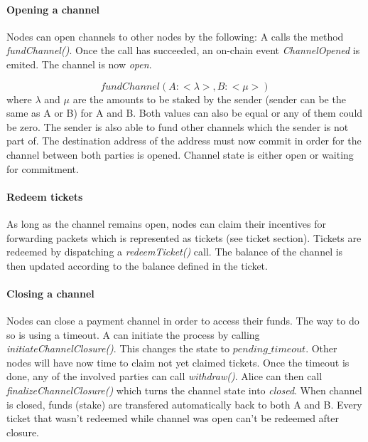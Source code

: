 \paragraph{Opening a channel} Nodes can open channels to other nodes by the following:
A calls the method \textit{fundChannel()}. Once the call has succeeded, an on-chain event \textit{ChannelOpened} is emited. The channel is now \textit{open}.


$$fundChannel(A: <\lambda>, B: <\mu>)$$ where $\lambda$ and $\mu$ are the amounts to be staked by the sender (sender can be the same as A or B) for A and B. Both values can also be equal or any of them could be zero. The sender is also able to fund other channels which the sender is not part of.
The destination address of the address must now commit in order for the channel between both parties is opened. Channel state is either open or waiting for commitment.

\paragraph{Redeem tickets}
As long as the channel remains open, nodes can claim their incentives for forwarding packets which is represented as tickets (see ticket section). Tickets are redeemed by dispatching a \textit{redeemTicket()} call. The balance of the channel is then updated according to the balance defined in the ticket.
\paragraph{Closing a channel}
Nodes can close a payment channel in order to access their funds. The way to do so is using a timeout.
A can initiate the process by calling \textit{initiateChannelClosure()}. This changes the state to $pending\_timeout$. Other nodes will have now time to claim not yet claimed tickets. Once the timeout is done, any of the involved parties can call \textit{withdraw()}. Alice can then call \textit{finalizeChannelClosure()} which turns the channel state into \textit{closed}. When channel is closed, funds (stake) are transfered automatically back to both A and B. Every ticket that wasn't redeemed while channel was open can't be redeemed after closure.

